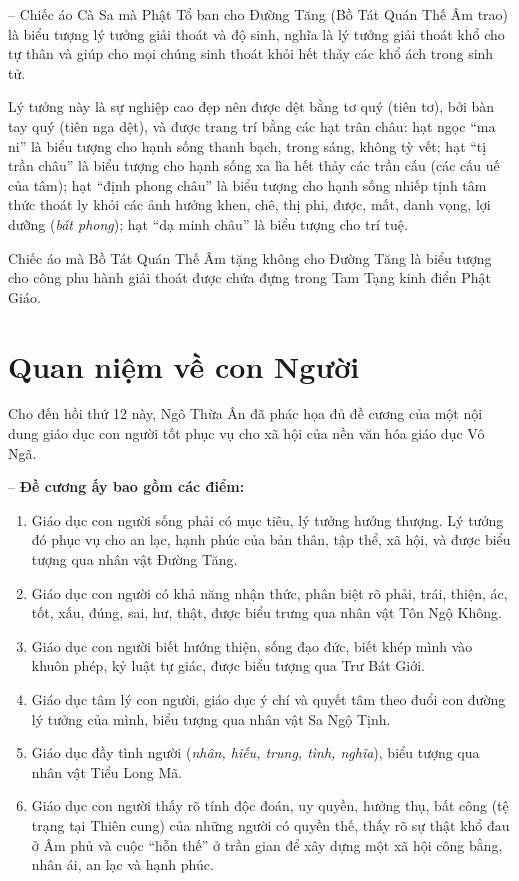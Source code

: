 -- Chiếc áo Cà Sa mà Phật Tổ ban cho Đường Tăng (Bồ Tát Quán Thế Âm trao) là biểu tượng lý tưởng giải thoát và độ sinh, nghĩa là lý tưởng giải thoát khổ cho tự thân và giúp cho mọi chúng sinh thoát khỏi hết thảy các khổ ách trong sinh tử.

Lý tưởng này là sự nghiệp cao đẹp nên được dệt bằng tơ quý (tiên tơ), bởi bàn tay quý (tiên nga dệt), và được trang trí bằng các hạt trân châu: hạt ngọc ``ma ni'' là biểu tượng cho hạnh sống thanh bạch, trong sáng, không tỳ vết; hạt ``tị trần châu'' là biểu tượng cho hạnh sống xa lìa hết thảy các trần cấu (các cấu uế của tâm); hạt ``định phong châu'' là biểu tượng cho hạnh sống nhiếp tịnh tâm thức thoát ly khỏi các ảnh hưởng khen, chê, thị phi, được, mất, danh vọng, lợi dưỡng (\emph{bát phong}); hạt ``dạ minh châu'' là biểu tượng cho trí tuệ.

Chiếc áo mà Bồ Tát Quán Thế Âm tặng không cho Đường Tăng là biểu tượng cho công phu hành giải thoát được chứa đựng trong Tam Tạng kinh điển Phật Giáo.


\section{Quan niệm về con Người} %
\label{sec:9_con_nguoi}

Cho đến hồi thứ 12 này, Ngô Thừa Ân đã phác họa đủ đề cương của một nội dung giáo dục con người tốt phục vụ cho xã hội của nền văn hóa giáo dục Vô Ngã.

-- {\bf Đề cương ấy bao gồm các điểm:}

\begin{enumerate}[label=\itshape\arabic*\upshape/]

    \item Giáo dục con người sống phải có mục tiêu, lý tưởng hướng thượng. Lý tưởng đó phục vụ cho an lạc, hạnh phúc của bản thân, tập thể, xã hội, và được biểu tượng qua nhân vật Đường Tăng.

    \item Giáo dục con người có khả năng nhận thức, phân biệt rõ phải, trái, thiện, ác, tốt, xấu, đúng, sai, hư, thật, được biểu trưng qua nhân vật Tôn Ngộ Không.

    \item Giáo dục con người biết hướng thiện, sống đạo đức, biết khép mình vào khuôn phép, kỷ luật tự giác, được biểu tượng qua Trư Bát Giới.

    \item Giáo dục tâm lý con người, giáo dục ý chí và quyết tâm theo đuổi con đường lý tưởng của mình, biểu tượng qua nhân vật Sa Ngộ Tịnh.

    \item Giáo dục đầy tình người (\emph{nhân, hiếu, trung, tình, nghĩa}), biểu tượng qua nhân vật Tiểu Long Mã.

    \item Giáo dục con người thấy rõ tính độc đoán, uy quyền, hưởng thụ, bất công (tệ trạng tại Thiên cung) của những người có quyền thế, thấy rõ sự thật khổ đau ở Âm phủ và cuộc ``hỗn thế'' ở trần gian để xây dựng một xã hội công bằng, nhân ái, an lạc và hạnh phúc.
\end{enumerate}

